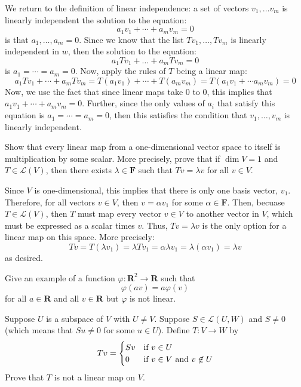 \documentclass[10pt]{article}
\renewcommand{\R}{\mathbf R}
\newcommand{\F}{\mathbf F}
\begin{document}
	\begin{solution}
		We return to the definition of linear independence: a set of vectors \( v_1, \dots v_m \) is linearly 
		independent the solution to the equation:
		\[
		a_1v_1 + \cdots + a_m v_m = 0
		\] 
		is that \( a_1, \dots, a_m = 0\). Since we know that the list \( Tv_1, \dots, Tv_m \) is linearly independent
		in \( w \), then the solution to the equation:
		\[
		a_1Tv_1 + \dots + a_mTv_m = 0
		\] 
		is \( a_1 = \cdots = a_m = 0 \). Now, apply the rules of \( T \) being a linear map:
		\[
		a_1Tv_1 + \cdots +  a_mTv_m = T(a_1v_1) + \cdots + T(a_m v_m) = T(a_1v_1 + \cdots a_m v_m) = 0
		\] 
		Now, we use the fact that since linear maps take 0 to 0, this implies that \( a_1 v_1 + \cdots + 
		a_m v_m = 0 \). Further, since the only values of \( a_i \) that satisfy this equation is 
		\( a_1 = \cdots = a_m = 0 \), then this satisfies the condition that \( v_1, \dots, v_m \) is linearly 
		independent.
	\end{solution}

	\begin{problem}
		Show that every linear map from a one-dimensional vector space to itself is multiplication by some 
		scalar. More precisely, prove that if \( \dim V =  1\) and \( T \in \mathcal L(V) \), then there 
		exists \( \lambda \in \F \) such that \( Tv = \lambda v \) for all \( v \in V \). 
	\end{problem}

	\begin{solution}
		Since \( V \) is one-dimensional, this implies that there is only one basis vector, \( v_1 \). Therefore, 
		for all vectors \( v \in V \), then \( v = \alpha v_1 \) for some \( \alpha \in \F \). Then, becuase 
		\( T \in \mathcal L(V) \), then \( T \) must map every vector \( v \in V \) to another vector in \( V \), 
		which must be expressed as a scalar times \( v \). Thus, \( Tv = \lambda v \) is the only option for 
		a linear map on this space. More precisely:
		\[
		Tv = T(\lambda v_1) = \lambda Tv_1 = \alpha \lambda v_1 = \lambda (\alpha v_1) = \lambda v
		\] 
		as desired. 
	\end{solution}

	\begin{problem}
		Give an example of a function \( \varphi: \R^2 \to \R \) such that 
		\[
		\varphi(av) = a \varphi(v)
		\] 
		for all \( a \in \R \) and all \( v \in \R \) but \( \varphi \) is not linear. 
	\end{problem}

	\begin{problem}
		Suppose \( U \) is a subspace of \( V \) with \( U \neq  V \). Suppose \( S \in \mathcal L(U, W) \) and 
		\( S \neq 0 \) (which means that \( Su \neq 0 \) for some \( u \in U \)). Define 
		\( T:V \to W \) by 
		\[
		Tv = \begin{cases}
			Sv & \text{if \( v \in U \)}\\
			0 & \text{if \( v \in V \) and \( v \not \in U \)}
		\end{cases}
		\] 
		Prove that \( T \) is not a linear map on \( V \). 
	\end{problem}
\end{document}
